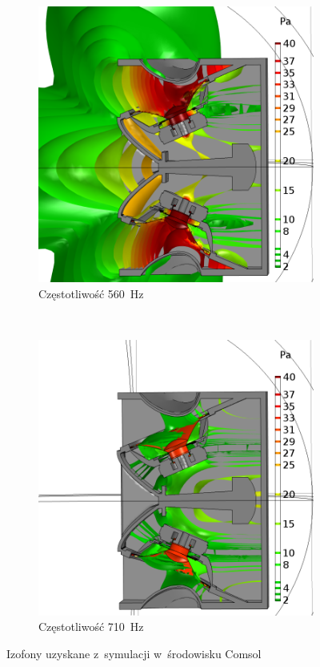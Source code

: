 \documentclass[12pt]{oska}
\begin{document}
		\begin{figure}[!ht]
			\centering
			\begin{subfigure}[b]{.49\textwidth}
				\includegraphics[width=\textwidth]{absp_560Hz.png}
				\caption{Częstotliwość \SI{560}{\hertz}}
				\label{r:C_560iz}
			\end{subfigure}
			~
			\begin{subfigure}[b]{.49\textwidth}
			\includegraphics[width=\textwidth]{absp_710Hz.png}
				\caption{Częstotliwość \SI{710}{\hertz}}
				\label{r:C_710iz}
			\end{subfigure}
			
			\caption{Izofony uzyskane z~symulacji w~środowisku Comsol}
			\label{r:C_balony}
		\end{figure}
		
\end{document}
